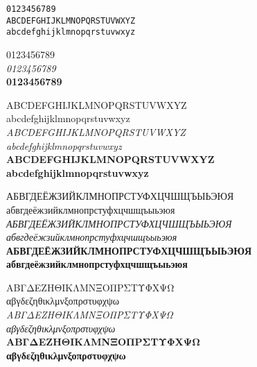 \documentclass[10pt]{article}
\begin{document}
\begin{sloppypar}
\begin{figure}[ht]
\begin{minipage}[b]{0.45\linewidth}
\end{minipage}
\hspace{0.5cm}
\begin{minipage}[b]{0.45\linewidth}

\noindent
\texttt{0123456789}\\


\noindent\texttt{ABCDEFGHIJKLMNOPQRSTUVWXYZ\\
abcdefghijklmnopqrstuvwxyz\\
}

\noindent
\textsf{
0123456789\\
\textit{0123456789}\\
\textbf{0123456789}\\
}

\noindent
\textsf{
ABCDEFGHIJKLMNOPQRSTUVWXYZ  \\
abcdefghijklmnopqrstuvwxyz  \\
\textit{ABCDEFGHIJKLMNOPQRSTUVWXYZ\\
abcdefghijklmnopqrstuvwxyz}\\
\textbf{ABCDEFGHIJKLMNOPQRSTUVWXYZ\\
abcdefghijklmnopqrstuvwxyz}\\
}

\noindent
\textsf{
АБВГДЕЁЖЗИЙКЛМНОПРСТУФХЦЧШЩЪЫЬЭЮЯ \\
абвгдеёжзийклмнопрстуфхцчшщъыьэюя \\
\textit{АБВГДЕЁЖЗИЙКЛМНОПРСТУФХЦЧШЩЪЫЬЭЮЯ\\
абвгдеёжзийклмнопрстуфхцчшщъыьэюя }\\
\textbf{АБВГДЕЁЖЗИЙКЛМНОПРСТУФХЦЧШЩЪЫЬЭЮЯ \\
абвгдеёжзийклмнопрстуфхцчшщъыьэюя }\\
}

\noindent
\textsf{
ΑΒΓΔΕΖΗΘΙΚΛΜΝΞΟΠΡΣΤΥΦΧΨΩ\\
αβγδεζηθικλμνξοπρστυφχψω\\
\textit{ΑΒΓΔΕΖΗΘΙΚΛΜΝΞΟΠΡΣΤΥΦΧΨΩ\\
αβγδεζηθικλμνξοπρστυφχψω}\\
\textbf{ΑΒΓΔΕΖΗΘΙΚΛΜΝΞΟΠΡΣΤΥΦΧΨΩ\\
αβγδεζηθικλμνξοπρστυφχψω}\\
}
\end{minipage}
\end{figure}



\end{sloppypar}
\end{document}
